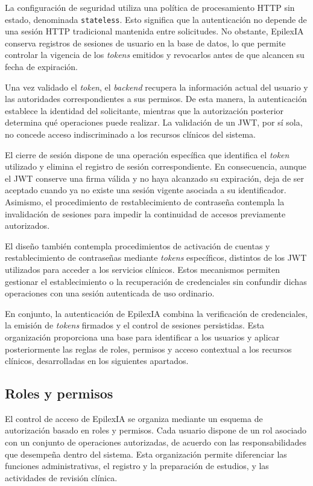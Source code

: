 La configuración de seguridad utiliza una política de procesamiento HTTP sin estado, denominada \texttt{stateless}. Esto significa que la autenticación no depende de una sesión HTTP tradicional mantenida entre solicitudes. No obstante, EpilexIA conserva registros de sesiones de usuario en la base de datos, lo que permite controlar la vigencia de los \textit{tokens} emitidos y revocarlos antes de que alcancen su fecha de expiración.

Una vez validado el \textit{token}, el \textit{backend} recupera la información actual del usuario y las autoridades correspondientes a sus permisos. De esta manera, la autenticación establece la identidad del solicitante, mientras que la autorización posterior determina qué operaciones puede realizar. La validación de un JWT, por sí sola, no concede acceso indiscriminado a los recursos clínicos del sistema.

El cierre de sesión dispone de una operación específica que identifica el \textit{token} utilizado y elimina el registro de sesión correspondiente. En consecuencia, aunque el JWT conserve una firma válida y no haya alcanzado su expiración, deja de ser aceptado cuando ya no existe una sesión vigente asociada a su identificador. Asimismo, el procedimiento de restablecimiento de contraseña contempla la invalidación de sesiones para impedir la continuidad de accesos previamente autorizados.

El diseño también contempla procedimientos de activación de cuentas y restablecimiento de contraseñas mediante \textit{tokens} específicos, distintos de los JWT utilizados para acceder a los servicios clínicos. Estos mecanismos permiten gestionar el establecimiento o la recuperación de credenciales sin confundir dichas operaciones con una sesión autenticada de uso ordinario.

En conjunto, la autenticación de EpilexIA combina la verificación de credenciales, la emisión de \textit{tokens} firmados y el control de sesiones persistidas. Esta organización proporciona una base para identificar a los usuarios y aplicar posteriormente las reglas de roles, permisos y acceso contextual a los recursos clínicos, desarrolladas en los siguientes apartados.


\subsection{Roles y permisos}
\label{subsec:roles-permisos}

El control de acceso de EpilexIA se organiza mediante un esquema de autorización basado en roles y permisos. Cada usuario dispone de un rol asociado con un conjunto de operaciones autorizadas, de acuerdo con las responsabilidades que desempeña dentro del sistema. Esta organización permite diferenciar las funciones administrativas, el registro y la preparación de estudios, y las actividades de revisión clínica.

